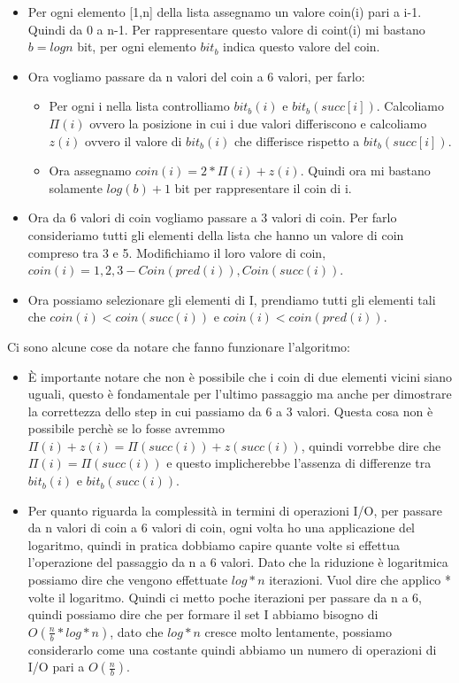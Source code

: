 \documentclass[14pt]{extreport}
\begin{document}
\begin{itemize}
    \item Per ogni elemento [1,n] della lista assegnamo un valore coin(i) pari a i-1. Quindi da 0 a n-1. Per rappresentare questo valore di coint(i) mi bastano $b = log n$ bit, per ogni elemento $bit_b$ indica questo valore del coin.
    \item Ora vogliamo passare da n valori del coin a 6 valori, per farlo:
        \begin{itemize}
            \item Per ogni i nella lista controlliamo $bit_b(i)$ e $bit_b(succ[i])$. Calcoliamo $\Pi(i)$ ovvero la posizione in cui i due valori differiscono e calcoliamo $z(i)$ ovvero il valore di $bit_b(i)$ che differisce rispetto a $bit_b(succ[i])$.
            \item Ora assegnamo $coin(i) = 2*\Pi(i) + z(i)$. Quindi ora mi bastano solamente $log(b) + 1$ bit per rappresentare il coin di i. 
        \end{itemize}
    \item Ora da 6 valori di coin vogliamo passare a 3 valori di coin. Per farlo consideriamo tutti gli elementi della lista che hanno un valore di coin compreso tra 3 e 5.
    Modifichiamo il loro valore di coin, $coin(i) = {1,2,3} - {Coin(pred(i)), Coin(succ(i))}$.
    \item Ora possiamo selezionare gli elementi di I, prendiamo tutti gli elementi tali che $coin(i) < coin(succ(i))$ e  $coin(i) < coin(pred(i))$.
\end{itemize}

Ci sono alcune cose da notare che fanno funzionare l'algoritmo:
\begin{itemize}
    \item È importante notare che non è possibile che i coin di due elementi vicini siano uguali, questo è fondamentale per l'ultimo passaggio ma anche per dimostrare la correttezza dello step in cui passiamo da 6 a 3 valori. Questa cosa non è possibile perchè se lo fosse avremmo $\Pi(i)+z(i) = \Pi(succ(i))+z(succ(i))$, quindi vorrebbe dire che $\Pi(i) = \Pi(succ(i))$ e questo implicherebbe l'assenza di differenze tra $bit_b(i)$ e $bit_b(succ(i))$. 
    \item Per quanto riguarda la complessità in termini di operazioni I/O, per passare da n valori di coin a 6 valori di coin, ogni volta ho una applicazione del logaritmo, quindi in pratica dobbiamo capire quante volte si effettua l'operazione del passaggio da n a 6 valori. Dato che la riduzione è logaritmica possiamo dire che vengono effettuate $log*n$ iterazioni. Vuol dire che applico * volte il logaritmo.
    Quindi ci metto poche iterazioni per passare da n a 6, quindi possiamo dire che per formare il set I abbiamo bisogno di $O(\frac{n}{b}*log*n)$, dato che $log*n$ cresce molto lentamente, possiamo considerarlo come una costante quindi abbiamo un numero di operazioni di I/O pari a $O(\frac{n}{b})$.
\end{itemize}
\end{document}
